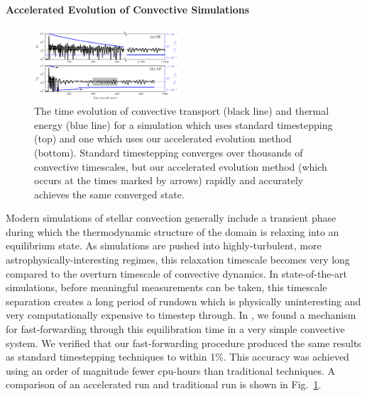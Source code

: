 \documentclass[preprint, hmargin=1in, vmargin=1in]{aastex62}
\begin{document}
\newpage
\paragraph{Accelerated Evolution of Convective Simulations}
\begin{figure}
	\begin{center}
	\vspace{-11pt}
    \includegraphics[width=0.48\textwidth]{./figs/nu_v_time.png}
	\vspace{-16pt}
	\end{center}
    \caption{
	\citep[Fig.~2 of][]{anders&all2018} The time evolution of convective transport (black line) and thermal energy (blue line) for a simulation which uses standard timestepping (top) and one which uses our accelerated evolution method (bottom).
	Standard timestepping converges over thousands of convective timescales, but our accelerated evolution method (which occurs at the times marked by arrows) rapidly and accurately achieves the same converged state.
	\label{fig:ae_plot} }
	\vspace{-11pt}
\end{figure}
Modern simulations of stellar convection generally include a transient phase during which the thermodynamic structure of the domain is relaxing into an equilibrium state.
As simulations are pushed into highly-turbulent, more astrophysically-interesting regimes, this relaxation timescale becomes very long compared to the overturn timescale of convective dynamics.
In state-of-the-art simulations, before meaningful measurements can be taken, this timescale separation creates a long period of rundown which is physically uninteresting and very computationally expensive to timestep through.
In \citet{anders&all2018}, we found a mechanism for fast-forwarding through this equilibration time in a very simple convective system.
We verified that our fast-forwarding procedure produced the same results as standard timestepping techniques to within 1\%.
This accuracy was achieved using an order of magnitude fewer cpu-hours than traditional techniques.
A comparison of an accelerated run and traditional run is shown in Fig.~\ref{fig:ae_plot}.
\end{document}
